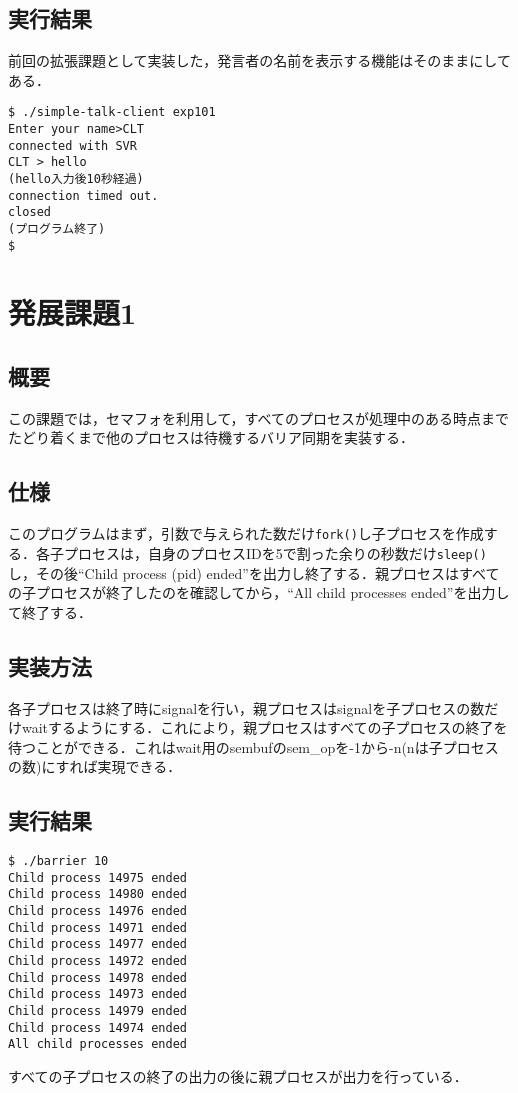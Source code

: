 \documentclass[a4j,10pt,titlepage]{jsarticle}
\begin{document}
\subsection{実行結果}
前回の拡張課題として実装した，発言者の名前を表示する機能はそのままにしてある．
\begin{verbatim}
$ ./simple-talk-client exp101
Enter your name>CLT
connected with SVR
CLT > hello
(hello入力後10秒経過)
connection timed out.
closed
(プログラム終了)
$
\end{verbatim}

\section{発展課題1}
\subsection{概要}
この課題では，セマフォを利用して，すべてのプロセスが処理中のある時点までたどり着くまで他のプロセスは待機するバリア同期を実装する．

\subsection{仕様}
このプログラムはまず，引数で与えられた数だけ\verb|fork()|し子プロセスを作成する．各子プロセスは，自身のプロセスIDを5で割った余りの秒数だけ\verb|sleep()|し，その後``Child process (pid) ended''を出力し終了する．親プロセスはすべての子プロセスが終了したのを確認してから，``All child processes ended''を出力して終了する．

\subsection{実装方法}
各子プロセスは終了時にsignalを行い，親プロセスはsignalを子プロセスの数だけwaitするようにする．これにより，親プロセスはすべての子プロセスの終了を待つことができる．これはwait用のsembufのsem\_opを-1から-n(nは子プロセスの数)にすれば実現できる．

\subsection{実行結果}
\begin{verbatim}
$ ./barrier 10
Child process 14975 ended
Child process 14980 ended
Child process 14976 ended
Child process 14971 ended
Child process 14977 ended
Child process 14972 ended
Child process 14978 ended
Child process 14973 ended
Child process 14979 ended
Child process 14974 ended
All child processes ended
\end{verbatim}
すべての子プロセスの終了の出力の後に親プロセスが出力を行っている．
\end{document}
